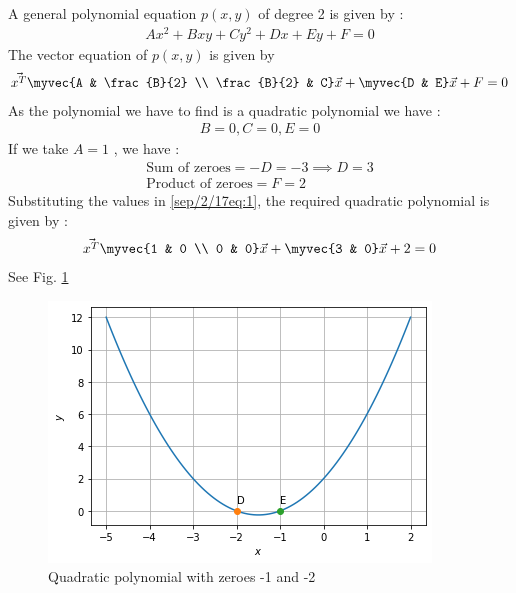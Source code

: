 A general polynomial equation $p(x,y)$ of degree 2 is given by :
\begin{align}
Ax^2 + Bxy + Cy^2 + Dx + Ey + F = 0
\end{align}
The vector equation of $p(x,y)$ is given by 
\begin{align}
\vec{x^T}\myvec{A & \frac{B}{2} \\ \frac{B}{2} & C}\vec{x} + \myvec{D & E}\vec{x} + F=0\label{sep/2/17eq:1}
\end{align}
As the polynomial we have to find is a quadratic polynomial we have :
\begin{align}
B = 0,
C = 0,
E = 0
\end{align}
If we take $A = 1$ , we have :
\begin{align}
\text{Sum of zeroes} = -D = -3
\implies D = 3\\
\text{Product of zeroes} = F = 2
\end{align}
Substituting the values in \eqref{sep/2/17eq:1}, the required quadratic polynomial is given by :
\begin{align}
\vec{x^T}\myvec{1 & 0 \\ 0 & 0}\vec{x} + \myvec{3 & 0}\vec{x} + 2=0
\end{align}
See Fig.     \ref{sep/2/17Quadratic polynomial with zeroes -1 and -2}
\begin{figure}[!ht]
       \centering
    \includegraphics[width=\columnwidth] {solutions/sep/17/Assignment_5_Fig_1.png}
    \caption{Quadratic polynomial with zeroes -1 and -2}
    \label{sep/2/17Quadratic polynomial with zeroes -1 and -2}
\end{figure}

